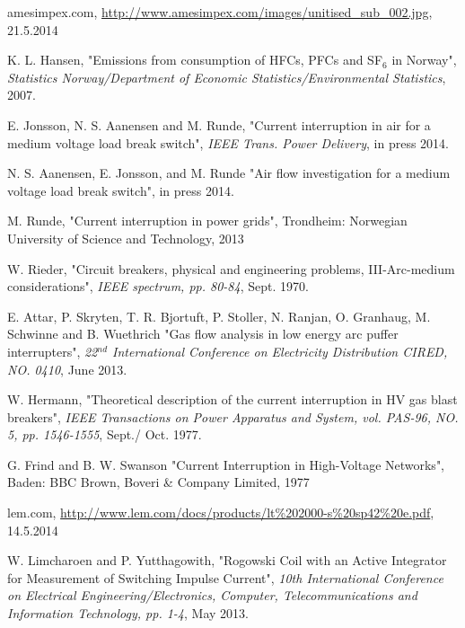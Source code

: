 \documentclass[10pt,b5paper,twoside]{article}
\begin{document}
\begin{thebibliography}{10}

 amesimpex.com, \url{http://www.amesimpex.com/images/unitised_sub_002.jpg}, 21.5.2014

 K. L. Hansen, "Emissions from consumption of HFCs, PFCs and SF$_6$ in Norway", \textit{Statistics Norway/Department of Economic Statistics/Environmental Statistics}, 2007.

 E. Jonsson, N. S. Aanensen and M. Runde, "Current interruption in air for a medium voltage load break switch", \textit{IEEE Trans. Power Delivery}, in press 2014.

 N. S. Aanensen, E. Jonsson, and M. Runde "Air flow investigation for a medium voltage load break switch", in press 2014.

 M. Runde, "Current interruption in power grids", Trondheim: Norwegian University of Science and Technology, 2013

 W. Rieder, "Circuit breakers, physical and engineering problems, III-Arc-medium considerations", \textit{IEEE spectrum, pp. 80-84}, Sept. 1970.

 E. Attar, P. Skryten, T. R. Bjortuft, P. Stoller, N. Ranjan, O. Granhaug, M. Schwinne and B. Wuethrich "Gas flow analysis in low energy arc puffer interrupters", \textit{22$^{nd}$ International Conference on Electricity Distribution CIRED, NO. 0410}, June 2013.

 W. Hermann, "Theoretical description of the current interruption in HV gas blast breakers", \textit{IEEE Transactions on Power Apparatus and System, vol. PAS-96, NO. 5, pp. 1546-1555}, Sept./ Oct. 1977.

 G. Frind and B. W. Swanson "Current Interruption in High-Voltage Networks", Baden: BBC Brown, Boveri \& Company Limited, 1977

 lem.com, \url{http://www.lem.com/docs/products/lt\%202000-s\%20sp42\%20e.pdf}, 14.5.2014

 W. Limcharoen and P. Yutthagowith, "Rogowski Coil with an Active Integrator for Measurement of Switching Impulse Current", \textit{10th International Conference on Electrical Engineering/Electronics, Computer, Telecommunications and Information Technology, pp. 1-4}, May 2013.



\end{thebibliography}
\end{document}
